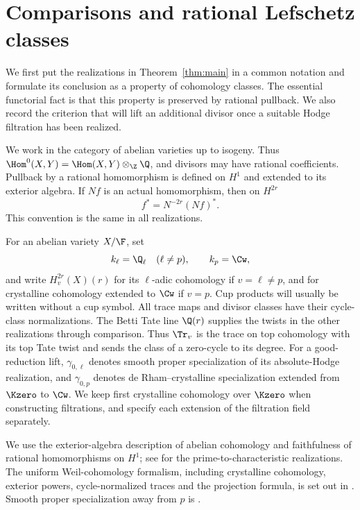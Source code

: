 \section{Comparisons and rational Lefschetz classes}
\label{sec:preliminaries}

We first put the realizations in Theorem~\ref{thm:main} in a common
notation and formulate its conclusion as a property of cohomology classes.
The essential functorial fact is that this property is preserved by rational
pullback. We also record the criterion that will lift an additional divisor
once a suitable Hodge filtration has been realized.

We work in the category of abelian varieties up to isogeny. Thus
\(\Hom^0(X,Y)=\Hom(X,Y)\otimes_\Z\Q\), and divisors may have rational
coefficients. Pullback by a rational homomorphism is defined on \(H^1\)
and extended to its exterior algebra. If \(Nf\) is an actual homomorphism,
then on \(H^{2r}\)
\begin{equation}\label{eq:rational-pullback}
 f^*=N^{-2r}(Nf)^*.
\end{equation}
This convention is the same in all realizations.

For an abelian variety \(X/\F\), set
\[
 k_\ell=\Q_\ell\quad(\ell\ne p),\qquad k_p=\Cw,
\]
and write \(H_v^{2r}(X)(r)\) for its \(\ell\)-adic cohomology if
\(v=\ell\ne p\), and for crystalline cohomology extended to \(\Cw\)
if \(v=p\). Cup products will usually be written without a cup symbol.
All trace maps and divisor classes have their cycle-class normalizations.
The Betti Tate line \(\Q(r)\) supplies the twists in the other
realizations through comparison. Thus \(\Tr_v\) is the trace on top
cohomology with its top Tate twist and sends the class of a zero-cycle to
its degree. For a good-reduction lift, \(\gamma_{0,\ell}\) denotes
smooth proper specialization of its absolute-Hodge realization, and
\(\gamma_{0,p}\) denotes de Rham--crystalline specialization extended
from \(\Kzero\) to \(\Cw\). We keep first crystalline cohomology
over \(\Kzero\) when constructing filtrations, and specify each
extension of the filtration field separately.

We use the exterior-algebra description of abelian cohomology and
faithfulness of rational homomorphisms on \(H^1\); see
\cite[Theorems~12.5 and~15.1]{MilneAV} for the prime-to-characteristic
realizations. The uniform Weil-cohomology formalism, including
crystalline cohomology, exterior powers, cycle-normalized traces and
the projection formula, is set out in
\cite[Section~1 and Appendix, Proposition~(A.2)]{Milne1999}. Smooth
proper specialization away from \(p\) is
\cite[Theorem~20.4]{MilneLEC}.

